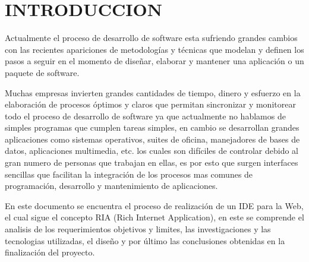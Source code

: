 \section{INTRODUCCION}

Actualmente el proceso de desarrollo de software esta sufriendo grandes cambios con las recientes apariciones de metodologías y técnicas que modelan y definen los pasos a seguir en el momento de diseñar, elaborar y mantener una aplicación o un paquete de software.

Muchas empresas invierten grandes cantidades de tiempo, dinero y esfuerzo en la elaboración de procesos óptimos y claros que permitan sincronizar y monitorear todo el proceso de desarrollo de software ya que actualmente no hablamos de simples programas que cumplen tareas simples, en cambio se desarrollan grandes aplicaciones como sistemas operativos, suites de oficina, manejadores de bases de datos, aplicaciones multimedia, etc. los cuales son difíciles de controlar debido al gran numero de personas que trabajan en ellas, es por esto que surgen interfaces sencillas que facilitan la integración de los procesos mas comunes de programación, desarrollo y mantenimiento de aplicaciones.

En este documento se encuentra el proceso de realización de un IDE para la Web, el cual sigue el concepto RIA (Rich Internet Application), en este se comprende el analisis de los requerimientos objetivos y limites, las investigaciones y las tecnologias utilizadas, el diseño y por último las conclusiones obtenidas en la finalización del proyecto.
